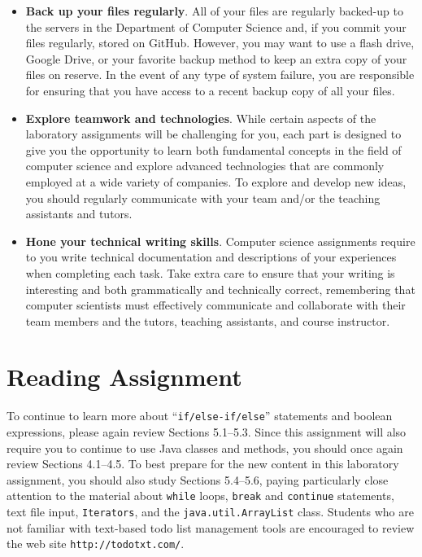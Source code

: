 \documentclass[11pt]{article}
\newcommand{\url}[1]{\lstinline{#1}}
\begin{document}
\begin{itemize}
\item {\bf Back up your files regularly}. All of your files are regularly backed-up to the servers in the Department of
  Computer Science and, if you commit your files regularly, stored on GitHub. However, you may want to use a flash
  drive, Google Drive, or your favorite backup method to keep an extra copy of your files on reserve. In the event of
  any type of system failure, you are responsible for ensuring that you have access to a recent backup copy of all your
  files.

\item {\bf Explore teamwork and technologies}. While certain aspects of the laboratory assignments will be challenging
  for you, each part is designed to give you the opportunity to learn both fundamental concepts in the field of computer
  science and explore advanced technologies that are commonly employed at a wide variety of companies. To explore and
  develop new ideas, you should regularly communicate with your team and/or the teaching assistants and tutors.

\item {\bf Hone your technical writing skills}. Computer science assignments require to you write technical
  documentation and descriptions of your experiences when completing each task. Take extra care to ensure that your
  writing is interesting and both grammatically and technically correct, remembering that computer scientists must
  effectively communicate and collaborate with their team members and the tutors, teaching assistants, and course
  instructor.


\end{itemize}

\section*{Reading Assignment}

To continue to learn more about ``{\tt if/else-if/else}'' statements and boolean expressions, please again review
Sections 5.1--5.3. Since this assignment will also require you to continue to use Java classes and methods, you should
once again review Sections 4.1--4.5. To best prepare for the new content in this laboratory assignment, you should also
study Sections 5.4--5.6, paying particularly close attention to the material about {\tt while} loops, {\tt break} and
{\tt continue} statements, text file input, {\tt Iterators}, and the {\tt java.util.ArrayList} class. Students who are
not familiar with text-based todo list management tools are encouraged to review the web site \url{http://todotxt.com/}.
\end{document}
